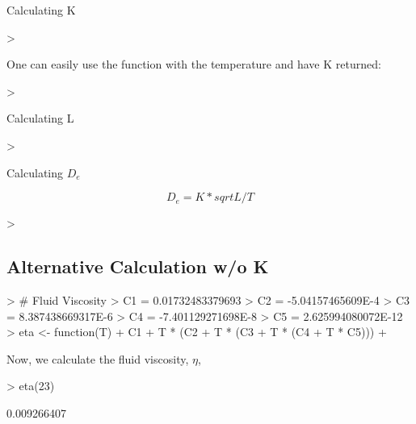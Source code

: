 Calculating K

\begin{Schunk}
\begin{Sinput}
> 
\end{Sinput}
\end{Schunk}

One can easily use the function with the temperature and have K returned: 

\begin{Schunk}
\begin{Sinput}
> 
\end{Sinput}
\end{Schunk}

Calculating L

\begin{Schunk}
\begin{Sinput}
> 
\end{Sinput}
\end{Schunk}

Calculating $D_e$

\begin{equation}
D_e = K * sqrt{L/T}
\end{equation}

\begin{Schunk}
\begin{Sinput}
> 
\end{Sinput}
\end{Schunk}

\subsection{Alternative Calculation w/o K}

\begin{Schunk}
\begin{Sinput}
> # Fluid Viscosity
> C1 = 0.01732483379693
> C2 = -5.04157465609E-4
> C3 = 8.387438669317E-6
> C4 = -7.401129271698E-8
> C5 = 2.625994080072E-12
> eta <- function(T){
+ C1 + T * (C2 + T * (C3 + T * (C4 + T * C5)))
+ } 
\end{Sinput}
\end{Schunk}

Now, we calculate the fluid viscosity, $\eta$, 

\begin{Schunk}
\begin{Sinput}
> eta(23)
\end{Sinput}
\begin{Soutput}
[1] 0.009266407
\end{Soutput}
\end{Schunk}


